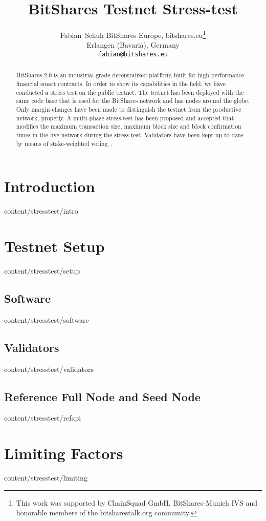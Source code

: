 \documentclass{btswhitepaper}
\title{BitShares Testnet Stress-test}
\author{
 Fabian~Schuh
 BitShares Europe, bitshares.eu\thanks{This work was supported by ChainSquad GmbH, BitShares-Munich IVS and honorable members of the bitsharestalk.org community.}\\
 Erlangen (Bavaria), Germany\\
 \texttt{fabian@bitshares.eu}
}
\begin{document}
\maketitle

\begin{abstract}%
 BitShares 2.0 is an industrial-grade decentralized platform built for
 high-performance financial smart contracts. In order to show its capabilities
 in the field, we have conducted a stress test on the public testnet. The
 testnet has been deployed with the same code base that is used for
 the BitShares network and has nodes around the globe. Only margin changes have
 been made to distinguish the testnet from the productive network, properly. A
 multi-phase stress-test has been proposed and accepted that modifies the
 maximum transaction size, maximum block size and block confirmation times in
 the live network during the stress test. Validators have been kept up to date
 by means of stake-weighted voting~\cite{bts:general}.
\end{abstract}

\section    { Introduction                       }  { content/stresstest/intro              } 
\section    { Testnet Setup                      }  { content/stresstest/setup              } 
\subsection { Software                           }  { content/stresstest/software           } 
\subsection { Validators                         }  { content/stresstest/validators         } 
\subsection { Reference Full Node and Seed Node  }  { content/stresstest/refapi             } 
\section    { Limiting Factors                   }  { content/stresstest/limiting           }
\end{document}
